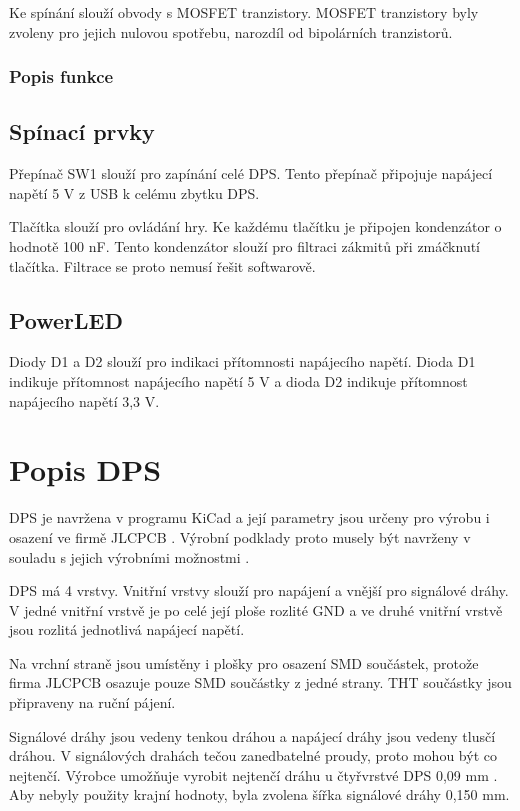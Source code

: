 Ke spínání slouží obvody s MOSFET tranzistory. MOSFET tranzistory byly zvoleny pro jejich nulovou spotřebu, narozdíl od 
bipolárních tranzistorů. 

\subsection{Popis funkce}

\section{Spínací prvky}
Přepínač SW1 slouží pro zapínání celé DPS. Tento přepínač připojuje napájecí napětí 5 V z USB k celému zbytku DPS.

Tlačítka slouží pro ovládání hry. Ke každému tlačítku je připojen kondenzátor o hodnotě 100 nF. Tento kondenzátor 
slouží pro filtraci zákmitů při zmáčknutí tlačítka. Filtrace se proto nemusí řešit softwarově.

\section{PowerLED}
Diody D1 a D2 slouží pro indikaci přítomnosti napájecího napětí.  Dioda D1 indikuje přítomnost napájecího napětí 
5 V a dioda D2 indikuje přítomnost napájecího napětí 3,3 V.

\chapter{Popis DPS}
DPS je navržena v programu KiCad a její parametry jsou určeny pro výrobu i osazení ve firmě JLCPCB \cite{JLCPCB}. Výrobní 
podklady proto musely být navrženy v souladu s jejich výrobními možnostmi \cite{JLCPCB_Capabilities}.

DPS má 4 vrstvy. Vnitřní vrstvy slouží pro napájení a vnější pro signálové dráhy. V jedné vnitřní vrstvě je po celé její ploše 
rozlité GND a ve druhé vnitřní vrstvě jsou rozlitá jednotlivá napájecí napětí.

Na vrchní straně jsou umístěny i plošky pro osazení SMD součástek, protože firma JLCPCB osazuje pouze SMD součástky z jedné 
strany. THT součástky jsou připraveny na ruční pájení.

Signálové dráhy jsou vedeny tenkou dráhou a napájecí dráhy jsou vedeny tlusčí dráhou. V signálových drahách tečou zanedbatelné 
proudy, proto mohou být co nejtenčí. Výrobce umožňuje vyrobit nejtenčí dráhu u čtyřvrstvé DPS 0,09 mm \cite{JLCPCB_Capabilities}. 
Aby nebyly použity krajní hodnoty, byla zvolena šířka signálové dráhy 0,150 mm.


